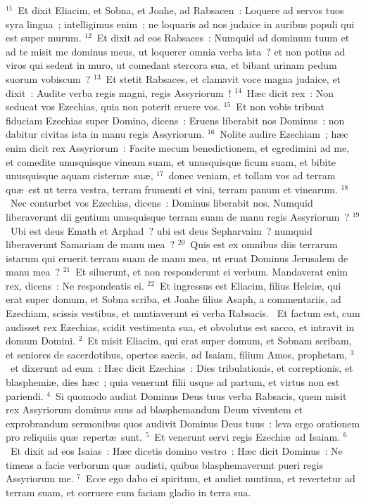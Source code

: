 ${}^{11}$~Et dixit Eliacim, et Sobna, et Joahe, ad Rabsacen~: Loquere ad servos tuos syra lingua~; intelligimus enim~; ne loquaris ad nos judaice in auribus populi qui est super murum.
${}^{12}$~Et dixit ad eos Rabsaces~: Numquid ad dominum tuum et ad te misit me dominus meus, ut loquerer omnia verba ista~? et non potius ad viros qui sedent in muro, ut comedant stercora sua, et bibant urinam pedum suorum vobiscum~?
${}^{13}$~Et stetit Rabsaces, et clamavit voce magna judaice, et dixit~: Audite verba regis magni, regis Assyriorum~!
${}^{14}$~H\ae c dicit rex~: Non seducat vos Ezechias, quia non poterit eruere vos.
${}^{15}$~Et non vobis tribuat fiduciam Ezechias super Domino, dicens~: Eruens liberabit nos Dominus~: non dabitur civitas ista in manu regis Assyriorum.
${}^{16}$~Nolite audire Ezechiam~; h\ae c enim dicit rex Assyriorum~: Facite mecum benedictionem, et egredimini ad me, et comedite unusquisque vineam suam, et unusquisque ficum suam, et bibite unusquisque aquam cistern\ae\ su\ae ,
${}^{17}$~donec veniam, et tollam vos ad terram qu\ae\ est ut terra vestra, terram frumenti et vini, terram panum et vinearum.
${}^{18}$~Nec conturbet vos Ezechias, dicens~: Dominus liberabit nos. Numquid liberaverunt dii gentium unusquisque terram suam de manu regis Assyriorum~?
${}^{19}$~Ubi est deus Emath et Arphad~? ubi est deus Sepharvaim~? numquid liberaverunt Samariam de manu mea~?
${}^{20}$~Quis est ex omnibus diis terrarum istarum qui eruerit terram suam de manu mea, ut eruat Dominus Jerusalem de manu mea~?
${}^{21}$~Et siluerunt, et non responderunt ei verbum. Mandaverat enim rex, dicens~: Ne respondeatis ei.
${}^{22}$~Et ingressus est Eliacim, filius Helci\ae , qui erat super domum, et Sobna scriba, et Joahe filius Asaph, a commentariis, ad Ezechiam, scissis vestibus, et nuntiaverunt ei verba Rabsacis.
~Et factum est, cum audisset rex Ezechias, scidit vestimenta sua, et obvolutus est sacco, et intravit in domum Domini.
${}^{2}$~Et misit Eliacim, qui erat super domum, et Sobnam scribam, et seniores de sacerdotibus, opertos saccis, ad Isaiam, filium Amos, prophetam,
${}^{3}$~et dixerunt ad eum~: H\ae c dicit Ezechias~: Dies tribulationis, et correptionis, et blasphemi\ae , dies h\ae c~; quia venerunt filii usque ad partum, et virtus non est pariendi.
${}^{4}$~Si quomodo audiat Dominus Deus tuus verba Rabsacis, quem misit rex Assyriorum dominus suus ad blasphemandum Deum viventem et exprobrandum sermonibus quos audivit Dominus Deus tuus~: leva ergo orationem pro reliquiis qu\ae\ repert\ae\ sunt.
${}^{5}$~Et venerunt servi regis Ezechi\ae\ ad Isaiam.
${}^{6}$~Et dixit ad eos Isaias~: H\ae c dicetis domino vestro~: H\ae c dicit Dominus~: Ne timeas a facie verborum qu\ae\ audisti, quibus blasphemaverunt pueri regis Assyriorum me.
${}^{7}$~Ecce ego dabo ei spiritum, et audiet nuntium, et revertetur ad terram suam, et corruere eum faciam gladio in terra sua.


